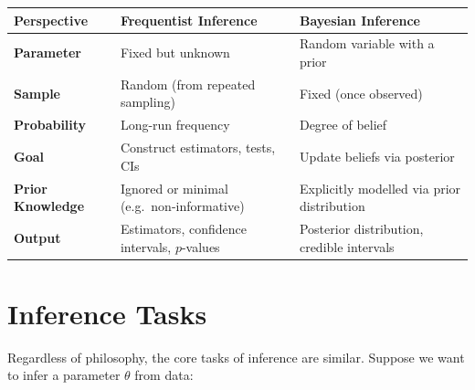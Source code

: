 \documentclass[
  letterpaper,
  DIV=11,
  numbers=noendperiod]{scrreprt}
\theoremstyle{definition}
\theoremstyle{plain}
\theoremstyle{definition}
\theoremstyle{remark}
\begin{document}
\begin{longtable}[]{@{}
  >{\raggedright\arraybackslash}p{}
  >{\raggedright\arraybackslash}p{}
  >{\raggedright\arraybackslash}p{}@{}}
\toprule\noalign{}
\begin{minipage}[b]{\linewidth}\raggedright
Perspective
\end{minipage} & \begin{minipage}[b]{\linewidth}\raggedright
Frequentist Inference
\end{minipage} & \begin{minipage}[b]{\linewidth}\raggedright
Bayesian Inference
\end{minipage} \\
\midrule\noalign{}
\endhead
\bottomrule\noalign{}
\endlastfoot
\textbf{Parameter} & Fixed but unknown & Random variable with a prior \\
\textbf{Sample} & Random (from repeated sampling) & Fixed (once
observed) \\
\textbf{Probability} & Long-run frequency & Degree of belief \\
\textbf{Goal} & Construct estimators, tests, CIs & Update beliefs via
posterior \\
\textbf{Prior Knowledge} & Ignored or minimal (e.g.~non-informative) &
Explicitly modelled via prior distribution \\
\textbf{Output} & Estimators, confidence intervals, \(p\)-values &
Posterior distribution, credible intervals \\
\end{longtable}

\section{Inference Tasks}\label{sec-inference-tasks}

Regardless of philosophy, the core tasks of inference are similar.
Suppose we want to infer a parameter \(\theta\) from data:
\end{document}
